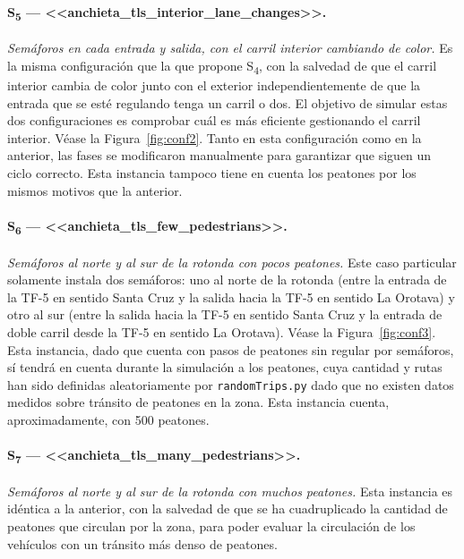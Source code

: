 \paragraph{S\textsubscript{5} --- <<anchieta\_tls\_interior\_lane\_changes>>.} \textit{Semáforos en cada entrada y salida, con el carril interior cambiando de color.} Es la misma configuración que la que propone S\textsubscript{4}, con la salvedad de que el carril interior cambia de color junto con el exterior independientemente de que la entrada que se esté regulando tenga un carril o dos. El objetivo de simular estas dos configuraciones es comprobar cuál es más eficiente gestionando el carril interior. Véase la Figura~\ref{fig:conf2}. Tanto en esta configuración como en la anterior, las fases se modificaron manualmente para garantizar que siguen un ciclo correcto. Esta instancia tampoco tiene en cuenta los peatones por los mismos motivos que la anterior.

\paragraph{S\textsubscript{6} --- <<anchieta\_tls\_few\_pedestrians>>.}\textit{ Semáforos al norte y al sur de la rotonda con pocos peatones.} Este caso particular solamente instala dos semáforos: uno al norte de la rotonda (entre la entrada de la TF-5 en sentido Santa Cruz y la salida hacia la TF-5 en sentido La Orotava) y otro al sur (entre la salida hacia la TF-5 en sentido Santa Cruz y la entrada de doble carril desde la TF-5 en sentido La Orotava). Véase la Figura~\ref{fig:conf3}. Esta instancia, dado que cuenta con pasos de peatones sin regular por semáforos, sí tendrá en cuenta durante la simulación a los peatones, cuya cantidad y rutas han sido definidas aleatoriamente por \texttt{randomTrips.py} dado que no existen datos medidos sobre tránsito de peatones en la zona. Esta instancia cuenta, aproximadamente, con 500 peatones.

\paragraph{S\textsubscript{7} --- <<anchieta\_tls\_many\_pedestrians>>.} \textit{Semáforos al norte y al sur de la rotonda con muchos peatones.} Esta instancia es idéntica a la anterior, con la salvedad de que se ha cuadruplicado la cantidad de peatones que circulan por la zona, para poder evaluar la circulación de los vehículos con un tránsito más denso de peatones.


